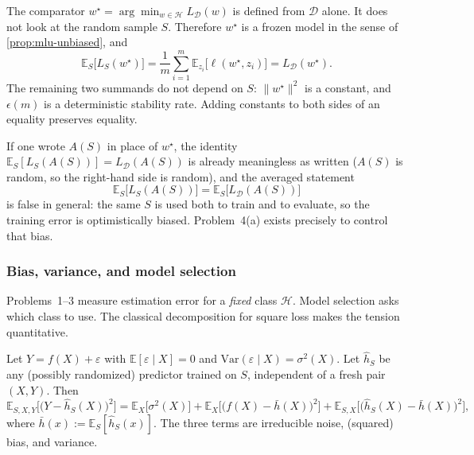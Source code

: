 \begin{solution}
The comparator $w^\star=\arg\min_{w\in\mathcal{H}}L_{\mathcal{D}}(w)$ is defined from $\mathcal{D}$ alone. It does not look at the random sample $S$. Therefore $w^\star$ is a frozen model in the sense of \cref{prop:mlu-unbiased}, and
\[
\mathbb{E}_S\bigl[L_S(w^\star)\bigr]
=
\frac1m\sum_{i=1}^m\mathbb{E}_{z_i}\bigl[\ell(w^\star,z_i)\bigr]
=
L_{\mathcal{D}}(w^\star).
\]
The remaining two summands do not depend on $S$: $\lVert w^\star\rVert^2$ is a constant, and $\epsilon(m)$ is a deterministic stability rate. Adding constants to both sides of an equality preserves equality.

If one wrote $A(S)$ in place of $w^\star$, the identity $\mathbb{E}_S[L_S(A(S))]=L_{\mathcal{D}}(A(S))$ is already meaningless as written ($A(S)$ is random, so the right-hand side is random), and the averaged statement
\[
\mathbb{E}_S\bigl[L_S(A(S))\bigr]
=
\mathbb{E}_S\bigl[L_{\mathcal{D}}(A(S))\bigr]
\]
is false in general: the same $S$ is used both to train and to evaluate, so the training error is optimistically biased. Problem~4(a) exists precisely to control that bias.
\end{solution}


\subsubsection{Bias, variance, and model selection}
\label{subsubsec:mlu-bv}

Problems~1--3 measure estimation error for a \emph{fixed} class $\mathcal{H}$. Model selection asks which class to use. The classical decomposition for square loss makes the tension quantitative.

\begin{definition}
\label{def:mlu-bv}
Let $Y=f(X)+\varepsilon$ with $\mathbb{E}[\varepsilon\mid X]=0$ and $\mathrm{Var}(\varepsilon\mid X)=\sigma^2(X)$. Let $\widehat{h}_S$ be any (possibly randomized) predictor trained on $S$, independent of a fresh pair $(X,Y)$. Then
\[
\mathbb{E}_{S,X,Y}\bigl[\bigl(Y-\widehat{h}_S(X)\bigr)^2\bigr]
=
\mathbb{E}_X\bigl[\sigma^2(X)\bigr]
+
\mathbb{E}_X\bigl[\bigl(f(X)-\bar h(X)\bigr)^2\bigr]
+
\mathbb{E}_{S,X}\bigl[\bigl(\widehat{h}_S(X)-\bar h(X)\bigr)^2\bigr],
\]
where $\bar h(x):=\mathbb{E}_S[\widehat{h}_S(x)]$. The three terms are irreducible noise, (squared) bias, and variance.
\end{definition}

